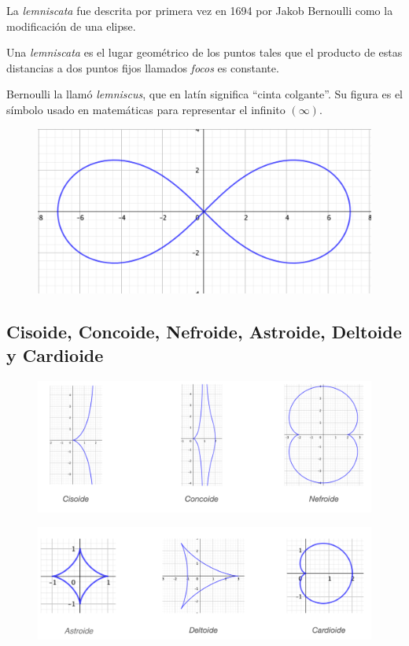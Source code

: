 \normalsize{La} \emph{lemniscata} fue descrita por primera vez en 1694 por Jakob Bernoulli como la modificación de una elipse. 
\begin{multicols}{2}

Una  \emph{lemniscata} es el lugar geométrico de los puntos tales que el
producto de estas distancias a dos puntos fijos llamados  \emph{focos} es
constante. 

Bernoulli la llamó  \emph{lemniscus}, que en latín significa ``cinta colgante''. Su figura es el símbolo usado en matemáticas para representar el infinito $(\infty)$.

	\begin{figure}[H]
	\centering
	\includegraphics[width=.4\textwidth]{img-polares/polares05.png}
	\end{figure}

\end{multicols}

\subsection{Cisoide, Concoide, Nefroide, Astroide, Deltoide y Cardioide}
\vspace{-5mm}

\begin{figure}[H]
	\centering
	\includegraphics[width=.7\textwidth]{img-polares/polares11a.png}
	\end{figure}
\vspace{-5mm}	
\begin{figure}[H]
	\centering
	\includegraphics[width=.7\textwidth]{img-polares/polares11b.png}
	\end{figure}


